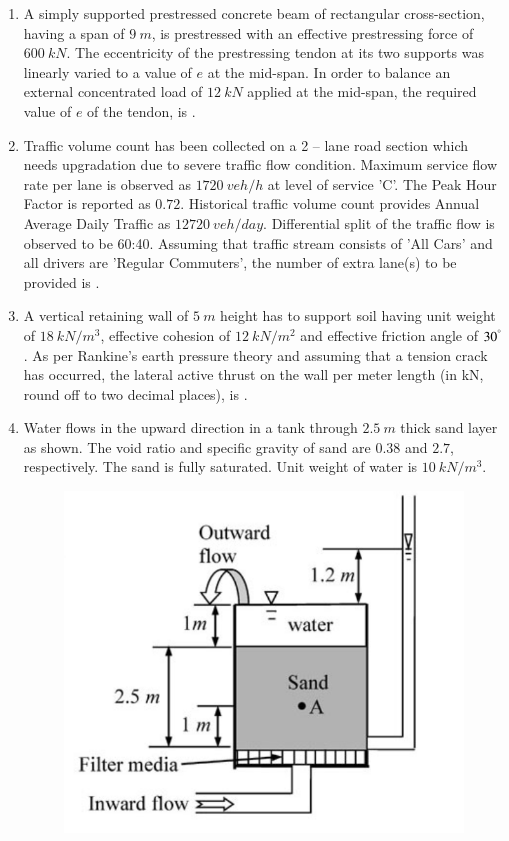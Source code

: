 \documentclass[journal]{IEEEtran}
\begin{document}
\begin{enumerate}
\item A simply supported prestressed concrete beam of rectangular cross-section, having a span of $9 \ m$, is prestressed with an effective prestressing force of $600 \ kN$. The eccentricity of the prestressing tendon at its two supports was linearly varied to a value of $e$ at the mid-span. In order to balance an external concentrated load of $12 \ kN$ applied at the mid-span, the required value of $e$  of the tendon, is \underline{\hspace{2cm}}. \hfill {}

\item Traffic volume count has been collected on a 2 -- lane road section which needs upgradation due to severe traffic flow condition. Maximum service flow rate per lane is observed as $1720 \ veh/h$ at level of service 'C'. The Peak Hour Factor is reported as $0.72$. Historical traffic volume count provides Annual Average Daily Traffic as $12720 \ veh/day$. Differential split of the traffic flow is observed to be 60:40. Assuming that traffic stream consists of 'All Cars' and all drivers are 'Regular Commuters', the number of extra lane(s)  to be provided is \underline{\hspace{2cm}}. \hfill {}

\item A vertical retaining wall of $5 \ m$ height has to support soil having unit weight of $18 \ kN/m^3$, effective cohesion of $12 \ kN/m^2$ and effective friction angle of $30^\degree$. As per Rankine's earth pressure theory and assuming that a tension crack has occurred, the lateral active thrust on the wall per meter length (in kN, round off to two decimal places), is \underline{\hspace{2cm}}. \hfill {}

\item Water flows in the upward direction in a tank through $2.5 \ m$ thick sand layer as shown. The void ratio and specific gravity of sand are $0.38$ and $2.7$, respectively. The sand is fully saturated. Unit weight of water is $10 \ kN/m^3$.  

\begin{figure}[H]
    \centering
    \includegraphics[width=0.3\columnwidth]{figs/Q57.png} 
    \caption{}
    \label{fig:placeholder}
\end{figure}


\end{enumerate}
\end{document}
